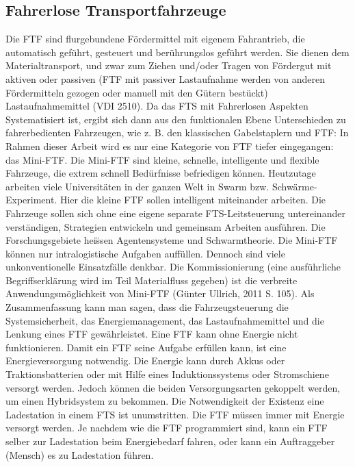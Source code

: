 \subsection{Fahrerlose Transportfahrzeuge}
Die FTF sind flurgebundene F\"ordermittel mit eigenem Fahrantrieb, die automatisch gef\"uhrt, gesteuert und ber\"uhrungslos gef\"uhrt werden. Sie dienen dem Materialtransport, und zwar zum Ziehen und/oder Tragen von F\"ordergut mit aktiven oder passiven (FTF mit passiver Lastaufnahme werden von anderen F\"ordermitteln gezogen oder manuell mit den G\"utern best\"uckt) Lastaufnahmemittel (VDI 2510). Da das FTS mit Fahrerlosen Aspekten Systematisiert ist, ergibt sich dann aus den funktionalen Ebene Unterschieden zu fahrerbedienten Fahrzeugen, wie z. B. den klassischen Gabelstaplern und FTF: In Rahmen dieser Arbeit wird es nur eine Kategorie von FTF tiefer eingegangen: das Mini-FTF. Die Mini-FTF sind kleine, schnelle, intelligente und flexible Fahrzeuge, die extrem schnell Bed\"urfnisse befriedigen k\"onnen. Heutzutage arbeiten viele Universit\"aten in der ganzen Welt in Swarm bzw. Schw\"arme-Experiment. Hier die kleine FTF sollen intelligent miteinander arbeiten. Die Fahrzeuge sollen sich ohne eine eigene separate FTS-Leitsteuerung untereinander verst\"andigen, Strategien entwickeln und gemeinsam Arbeiten ausf\"uhren. Die Forschungsgebiete hei\"ssen Agentensysteme und Schwarmtheorie. Die Mini-FTF k\"onnen nur intralogistische Aufgaben auff\"ullen. Dennoch sind viele unkonventionelle Einsatzf\"alle denkbar. Die Kommissionierung (eine ausf\"uhrliche Begriffserkl\"arung wird im Teil Materialfluss gegeben) ist die verbreite Anwendungsm\"oglichkeit von Mini-FTF (G\"unter Ullrich, 2011 S. 105).
Als Zusammenfassung kann man sagen, dass die Fahrzeugsteuerung die Systemsicherheit, das Energiemanagement, das Lastaufnahmemittel und die Lenkung eines FTF gew\"ahrleistet. Eine FTF kann ohne Energie nicht funktionieren. Damit ein FTF seine Aufgabe erf\"ullen kann, ist eine Energieversorgung notwendig. Die Energie kann durch Akkus oder Traktionsbatterien oder mit Hilfe eines Induktionssystems oder Stromschiene versorgt werden. Jedoch k\"onnen die beiden Versorgungsarten gekoppelt werden, um einen Hybridsystem zu bekommen. Die Notwendigkeit der Existenz eine Ladestation in einem FTS ist unumstritten. Die FTF m\"ussen immer mit Energie versorgt werden. Je nachdem wie die FTF programmiert sind, kann ein FTF selber zur Ladestation beim Energiebedarf fahren, oder kann ein Auftraggeber (Mensch) es zu Ladestation f\"uhren.

